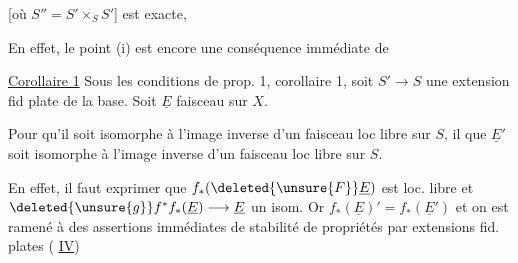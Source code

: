 

[où $S''=S'\times_S S'$] est exacte, 

 En effet, le point (i) est encore une conséquence immédiate de

\uline{Corollaire 1} Sous les conditions de prop. 1,  corollaire 1, soit $S'\longrightarrow S$ une extension fid plate  de la base. Soit $\underline E$ faisceau  sur $X$.

Pour qu'il soit isomorphe à l'image inverse d'un faisceau loc libre  sur $S$, il  que $\underline E'$ soit isomorphe à l'image inverse d'un faisceau loc libre sur $S$.

En effet, il faut exprimer que $f_*(\deleted{\unsure{F}}\underline E)$ est loc. libre et $\deleted{\unsure{g}}f^*f_*(\underline E)\longrightarrow\underline E$ un isom. Or $f_*(\underline E)'=f_*(\underline E')$  et on est ramené à des assertions immédiates de stabilité de propriétés par extensions fid. plates ( \uline{IV})

